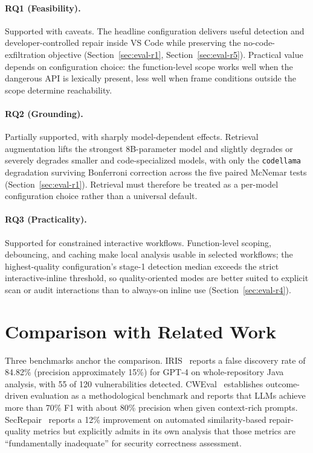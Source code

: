 \paragraph{RQ1 (Feasibility).} Supported with caveats. The headline configuration delivers useful detection and developer-controlled repair inside VS Code while preserving the no-code-exfiltration objective (Section~\ref{sec:eval-r1}, Section~\ref{sec:eval-r5}). Practical value depends on configuration choice: the function-level scope works well when the dangerous API is lexically present, less well when frame conditions outside the scope determine reachability.

\paragraph{RQ2 (Grounding).} Partially supported, with sharply model-dependent effects. Retrieval augmentation lifts the strongest 8B-parameter model and slightly degrades or severely degrades smaller and code-specialized models, with only the \texttt{codellama} degradation surviving Bonferroni correction across the five paired McNemar tests (Section~\ref{sec:eval-r1}). Retrieval must therefore be treated as a per-model configuration choice rather than a universal default.

\paragraph{RQ3 (Practicality).} Supported for constrained interactive workflows. Function-level scoping, debouncing, and caching make local analysis usable in selected workflows; the highest-quality configuration's stage-1 detection median exceeds the strict interactive-inline threshold, so quality-oriented modes are better suited to explicit scan or audit interactions than to always-on inline use (Section~\ref{sec:eval-r4}).

\section{Comparison with Related Work}

Three benchmarks anchor the comparison. IRIS~\cite{li2025iris} reports a false discovery rate of 84.82\% (precision approximately 15\%) for GPT-4 on whole-repository Java analysis, with 55 of 120 vulnerabilities detected. CWEval~\cite{peng2025cweval} establishes outcome-driven evaluation as a methodological benchmark and reports that LLMs achieve more than 70\% F1 with about 80\% precision when given context-rich prompts. SecRepair~\cite{islam2024secrepair} reports a 12\% improvement on automated similarity-based repair-quality metrics but explicitly admits in its own analysis that those metrics are ``fundamentally inadequate'' for security correctness assessment.

